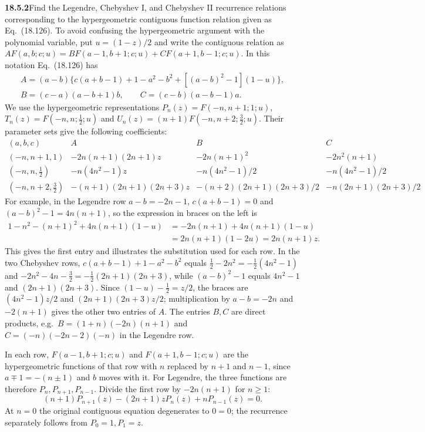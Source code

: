 \par\bigskip
\noindent\textbf{18.5.2}\quad Find the Legendre, Chebyshev I, and
Chebyshev II recurrence relations corresponding to the
hypergeometric contiguous function relation given as Eq.~(18.126).
\solution
To avoid confusing the hypergeometric argument with the polynomial
variable, put $u=(1-z)/2$ and write the contiguous relation as
$AF(a,b;c;u)=BF(a-1,b+1;c;u)+CF(a+1,b-1;c;u)$.
In this notation Eq.~(18.126) has
\begin{gather*}
A=(a-b)\{c(a+b-1)+1-a^2-b^2+[(a-b)^2-1](1-u)\},\\
B=(c-a)(a-b+1)b,\qquad C=(c-b)(a-b-1)a.
\end{gather*}
We use the hypergeometric representations
$P_n(z)=F(-n,n+1;1;u)$, $T_n(z)=F(-n,n;\frac12;u)$ and
$U_n(z)=(n+1)F(-n,n+2;\frac32;u)$.
Their parameter sets give the following coefficients:
\[
\begin{array}{c|c|c|c}
(a,b,c)&A&B&C\\\hline
(-n,n+1,1)&-2n(n+1)(2n+1)z&-2n(n+1)^2&-2n^2(n+1)\\
(-n,n,\tfrac12)&-n(4n^2-1)z&-n(4n^2-1)/2&-n(4n^2-1)/2\\
(-n,n+2,\tfrac32)&-(n+1)(2n+1)(2n+3)z
 &-(n+2)(2n+1)(2n+3)/2&-n(2n+1)(2n+3)/2
\end{array}
\]
For example, in the Legendre row $a-b=-2n-1$, $c(a+b-1)=0$ and
$(a-b)^2-1=4n(n+1)$, so the expression in braces on the left is
\begin{align*}
1-n^2-(n+1)^2+4n(n+1)(1-u)
&=-2n(n+1)+4n(n+1)(1-u)\\
&=2n(n+1)(1-2u)=2n(n+1)z.
\end{align*}
This gives the first entry and illustrates the substitution used
for each row.  In the two Chebyshev rows, $c(a+b-1)+1-a^2-b^2$
equals $\frac12-2n^2=-\frac12(4n^2-1)$ and
$-2n^2-4n-\frac32=-\frac12(2n+1)(2n+3)$, while $(a-b)^2-1$ equals
$4n^2-1$ and $(2n+1)(2n+3)$.  Since $(1-u)-\frac12=z/2$, the
braces are $(4n^2-1)z/2$ and $(2n+1)(2n+3)z/2$; multiplication by
$a-b=-2n$ and $-2(n+1)$ gives the other two entries of $A$.
The entries $B,C$ are direct products, e.g.\ $B=(1+n)(-2n)(n+1)$
and $C=(-n)(-2n-2)(-n)$ in the Legendre row.

In each row, $F(a-1,b+1;c;u)$ and $F(a+1,b-1;c;u)$ are the
hypergeometric functions of that row with $n$ replaced by $n+1$
and $n-1$, since $a\mp1=-(n\pm1)$ and $b$ moves with it.
For Legendre, the three functions are therefore $P_n,P_{n+1},P_{n-1}$.
Divide the first row by $-2n(n+1)$ for $n\ge1$:
\[
\boxed{(n+1)P_{n+1}(z)-(2n+1)zP_n(z)+nP_{n-1}(z)=0}.
\]
At $n=0$ the original contiguous equation degenerates to $0=0$;
the recurrence separately follows from $P_0=1,P_1=z$.

